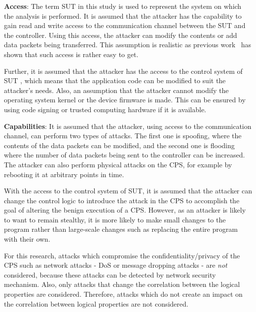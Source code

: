 {\bf Access}: The term \ac{SUT} in this study is used to represent the system on which the analysis is performed. It is assumed that the attacker has the capability to gain read and write access to the communication channel between the \ac{SUT} and the controller. Using this access, the attacker can modify the contents or add data packets being transferred. This assumption is realistic as previous work~\cite{davanian2017diversity, ericsson2010cyber} has shown that such access is rather easy to get.

Further, it is assumed that the attacker has the access to the control system of \ac{SUT} \cite{alemzadeh2016targeted}, which means that the application code can be modified to suit the attacker's needs. Also, an assumption that the attacker cannot modify the operating system kernel or the device firmware is made. This can be ensured by using code signing or trusted computing hardware if it is available. 

{\bf Capabilities}: It is assumed that the attacker, using access to the communication channel, can perform two types of attacks. The first one is spoofing, where the contents of the data packets can be modified, and the second one is flooding where the number of data packets being sent to the controller can be increased. The attacker can also perform physical attacks on the \ac{CPS}, for example by rebooting it at arbitrary points in time. 

With the access to the control system of \ac{SUT}, it is assumed that the attacker can change the control logic to introduce the attack in the \ac{CPS} to accomplish the goal of altering the benign execution of a \ac{CPS}. However, as an attacker is likely to want to remain stealthy, it is more likely to make small changes to the program rather than large-scale changes such as replacing the entire program with their own. 
 
For this research, attacks which compromise the confidentiality/privacy of the \ac{CPS} such as network attacks - \ac{DoS} or message dropping attacks - are \textit{not} considered, because these attacks can be detected by network security mechanism. Also, only attacks that change the correlation between the logical properties are considered. Therefore, attacks which do not create an impact on the correlation between logical properties are not considered. 


